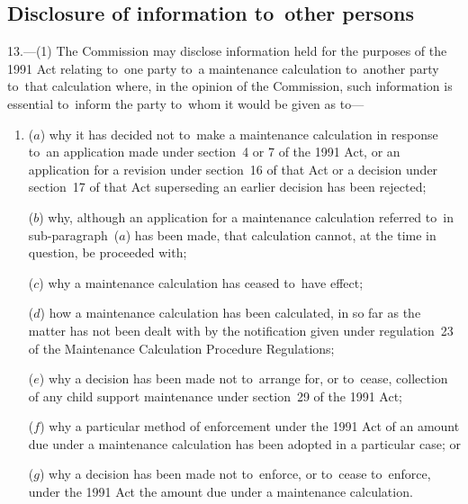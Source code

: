 \documentclass[12pt,a4paper]{article}
\begin{document}

\subsection[13. Disclosure of information to~other persons]{Disclosure of information to~other persons}

13.---(1)  The Commission may disclose information held for the purposes of the 1991 Act relating to~one party to~a maintenance calculation to~another party to~that calculation where, in the opinion of the Commission, such information is essential to~inform the party to~whom it would be given as to—
\begin{enumerate}\item[]
($a$) why it has decided not to~make a maintenance calculation in response to~an application made under section~4 or 7 of the 1991 Act, or an application for a revision under section~16 of that Act or a decision under section~17 of that Act superseding an earlier decision has been rejected;

($b$) why, although an application for a maintenance calculation referred to~in sub-paragraph~($a$)  has been made, that calculation cannot, at the time in question, be proceeded with;

($c$) why a maintenance calculation has ceased to~have effect;

($d$) how a maintenance calculation has been calculated, in so far as the matter has not been dealt with by the notification given under regulation~23 of the Maintenance Calculation Procedure Regulations;

($e$) why a decision has been made not to~arrange for, or to~cease, collection of any child support maintenance under section~29 of the 1991 Act;

($f$) why a particular method of enforcement under the 1991 Act of an amount due under a maintenance calculation has been adopted in a particular case; or

($g$) why a decision has been made not to~enforce, or to~cease to~enforce, under the 1991 Act the amount due under a maintenance calculation.
\end{enumerate}
\end{document}
